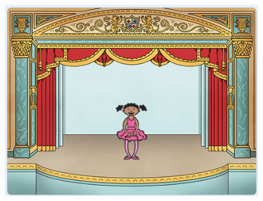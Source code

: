 \documentclass[10pt, a4paper]{article}
\begin{document}
\begin{enumerate}
        \begin{figure}[htbp]
            \begin{minipage}[t]{.48\textwidth}
                \centering
                \begin{minipage}{.4\textwidth}
                    \centering
                    \includegraphics[width=\textwidth]{8.jpg}
                \end{minipage}
                \begin{minipage}{.28\textwidth}
                    \centering

\end{minipage}
\end{minipage}
\end{figure}
\end{enumerate}
\end{document}
